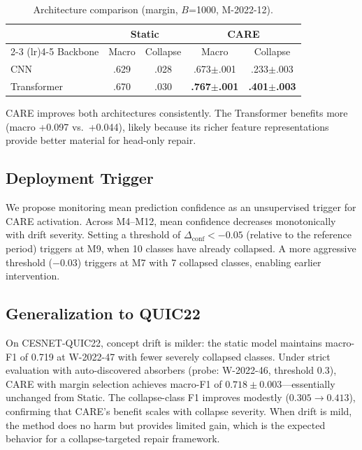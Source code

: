 \documentclass[journal]{IEEEtran}
\newcommand{\ours}{CARE}  %
\begin{document}
\begin{table}[t]
\centering
\caption{Architecture comparison (margin, $B$=1000, M-2022-12).}
\label{tab:arch}
\small
\begin{tabular}{@{}l cc cc@{}}
\toprule
& \multicolumn{2}{c}{Static} & \multicolumn{2}{c}{\ours{}} \\
\cmidrule(lr){2-3} \cmidrule(lr){4-5}
Backbone & Macro & Collapse & Macro & Collapse \\
\midrule
CNN & .629 & .028 & .673$\pm$.001 & .233$\pm$.003 \\
Transformer & .670 & .030 & \textbf{.767$\pm$.001} & \textbf{.401$\pm$.003} \\
\bottomrule
\end{tabular}
\end{table}

CARE improves both architectures consistently. The Transformer benefits more (macro +0.097 vs.\ +0.044), likely because its richer feature representations provide better material for head-only repair.

\subsection{Deployment Trigger}
\label{sec:trigger}

We propose monitoring mean prediction confidence as an unsupervised trigger for \ours{} activation. Across M4--M12, mean confidence decreases monotonically with drift severity. Setting a threshold of $\Delta_{\text{conf}} < -0.05$ (relative to the reference period) triggers at M9, when 10 classes have already collapsed. A more aggressive threshold ($-0.03$) triggers at M7 with 7 collapsed classes, enabling earlier intervention.

\subsection{Generalization to QUIC22}

On CESNET-QUIC22, concept drift is milder: the static model maintains macro-F1 of 0.719 at W-2022-47 with fewer severely collapsed classes. Under strict evaluation with auto-discovered absorbers (probe: W-2022-46, threshold 0.3), \ours{} with margin selection achieves macro-F1 of $0.718{\pm}0.003$---essentially unchanged from Static.
The collapse-class F1 improves modestly ($0.305\to0.413$), confirming that \ours{}'s benefit scales with collapse severity. When drift is mild, the method does no harm but provides limited gain, which is the expected behavior for a collapse-targeted repair framework.
\end{document}
